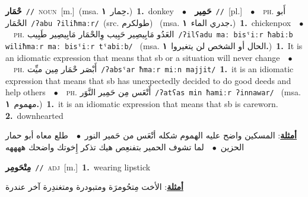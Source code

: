 \documentclass[10pt,a4paper,twoside]{article} %
\begin{document}
\begin{multicols}{2}
{\setlength\topsep{0pt}\textbf{\foreignlanguage{arabic}{حْمَار}}\ {\color{gray}\texttt{//}\color{black}}\ \textsc{noun}\ [m.]\ \color{gray}(msa. \foreignlanguage{arabic}{حِمار}~\foreignlanguage{arabic}{\textbf{١.}})\color{black}\ \textbf{1.}~donkey\ \ $\bullet$\ \ \setlength\topsep{0pt}\textbf{\foreignlanguage{arabic}{حَمِير}}\ {\color{gray}\texttt{//}\color{black}}\ [pl.]\ \ $\bullet$\ \ \textsc{ph.} \color{gray} \foreignlanguage{arabic}{أَبو الحْمَار}\color{black}\ {\color{gray}\texttt{/{\sffamily ʔabu ʔiliħmaːr}/}\color{black}}\ \color{gray}(src. \foreignlanguage{arabic}{طولكرم})\color{black}\ \color{gray} (msa. \foreignlanguage{arabic}{جدري الماء}~\foreignlanguage{arabic}{\textbf{١.}})\color{black}\ \textbf{1.}~chickenpox\ \ $\bullet$\ \ \textsc{ph.} \color{gray} \foreignlanguage{arabic}{العَدُو مَابِيصِير حَبِيب وِالحْمَار مَابِيصِير طَبِيب}\color{black}\ {\color{gray}\texttt{/{\sffamily ʔilʕadu maː bisˤiːr ħabiːb wiliħmaːr maː bisˤiːr tˤabiːb}/}\color{black}}\ \color{gray} (msa. \foreignlanguage{arabic}{الحال أو الشخص لن يتغيروا}~\foreignlanguage{arabic}{\textbf{١.}})\color{black}\ \textbf{1.}~It is an idiomatic expression that means that sb or a situation will never change\ \ $\bullet$\ \ \textsc{ph.} \color{gray} \foreignlanguage{arabic}{أَبْصَر حْمَار مِين ميِّت}\color{black}\ {\color{gray}\texttt{/{\sffamily ʔabsˤar ħmaːr miːn majjit}/}\color{black}}\ \textbf{1.}~it is an idiomatic expression that means that sb has unexpectedly decided to do good deeds and help others\ \ $\bullet$\ \ \textsc{ph.} \color{gray} \foreignlanguage{arabic}{أَتْعَس مِن حَمِير النَّوَر}\color{black}\ {\color{gray}\texttt{/{\sffamily ʔatʕas min ħamiːr ʔinnawar}/}\color{black}}\ \color{gray} (msa. \foreignlanguage{arabic}{مهموم}~\foreignlanguage{arabic}{\textbf{١.}})\color{black}\ \textbf{1.}~it is an idiomatic expression that means that sb is careworn.  \textbf{2.}~downhearted\  \begin{flushright}\color{gray}\foreignlanguage{arabic}{\textbf{\underline{\foreignlanguage{arabic}{أمثلة}}}: المسكين واضح عليه الهموم شكله أتْعَس من حَمير النور\ $\bullet$\ \  طلع معاه أبو حمار الحزين\ $\bullet$\ \  لما تشوف الحمير بتفنعِص هيك تذكر إِخوتك واضحك ههههه}\end{flushright}\color{black}} \vspace{2mm}

{\setlength\topsep{0pt}\textbf{\foreignlanguage{arabic}{مِتْحَومِر}}\ {\color{gray}\texttt{//}\color{black}}\ \textsc{adj}\ [m.]\ \textbf{1.}~wearing lipstick\  \begin{flushright}\color{gray}\foreignlanguage{arabic}{\textbf{\underline{\foreignlanguage{arabic}{أمثلة}}}: الأخت مِتحُومرَة ومتبودرة ومتغندِرة آخر عندرة}\end{flushright}\color{black}} \vspace{2mm}


\end{multicols}
\end{document}
